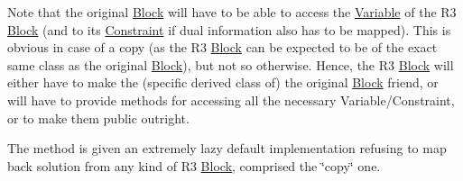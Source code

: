 Note that the original \mbox{\hyperlink{class_s_m_spp__di__unipi__it_1_1_block}{Block}} will have to be able to access the \mbox{\hyperlink{class_s_m_spp__di__unipi__it_1_1_variable}{Variable}} of the R3 \mbox{\hyperlink{class_s_m_spp__di__unipi__it_1_1_block}{Block}} (and to its \mbox{\hyperlink{class_s_m_spp__di__unipi__it_1_1_constraint}{Constraint}} if dual information also has to be mapped). This is obvious in case of a copy (as the R3 \mbox{\hyperlink{class_s_m_spp__di__unipi__it_1_1_block}{Block}} can be expected to be of the exact same class as the original \mbox{\hyperlink{class_s_m_spp__di__unipi__it_1_1_block}{Block}}), but not so otherwise. Hence, the R3 \mbox{\hyperlink{class_s_m_spp__di__unipi__it_1_1_block}{Block}} will either have to make the (specific derived class of) the original \mbox{\hyperlink{class_s_m_spp__di__unipi__it_1_1_block}{Block}} friend, or will have to provide methods for accessing all the necessary Variable/\+Constraint, or to make them public outright.

The method is given an extremely lazy default implementation refusing to map back solution from any kind of R3 \mbox{\hyperlink{class_s_m_spp__di__unipi__it_1_1_block}{Block}}, comprised the \char`\"{}copy\char`\"{} one. \mbox{\label{class_s_m_spp__di__unipi__it_1_1_block_a26eeed482e287e1f8a384826c789f9e0}} 

